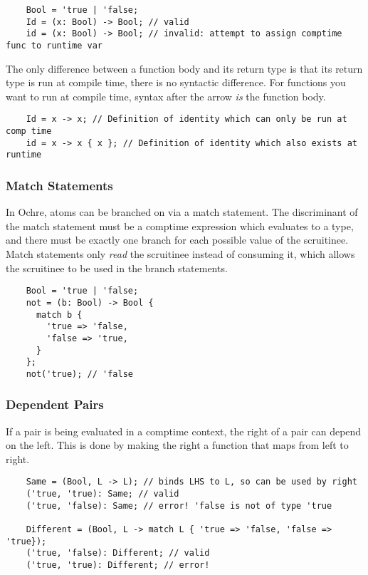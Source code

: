\documentclass[12pt,twoside]{report}
\begin{document}
\begin{listing}[H]
  \begin{verbatim}
    Bool = 'true | 'false;
    Id = (x: Bool) -> Bool; // valid
    id = (x: Bool) -> Bool; // invalid: attempt to assign comptime func to runtime var
  \end{verbatim}
\end{listing}

The only difference between a function body and its return type is that its return type is run at compile time, there is no syntactic difference. For functions you want to run at compile time, syntax after the arrow \textit{is} the function body.

  \begin{verbatim}
    Id = x -> x; // Definition of identity which can only be run at comp time
    id = x -> x { x }; // Definition of identity which also exists at runtime
  \end{verbatim}

\subsubsection{Match Statements}
In Ochre, atoms can be branched on via a match statement. The discriminant of the match statement must be a comptime expression which evaluates to a type, and there must be exactly one branch for each possible value of the scruitinee. Match statements only \textit{read} the scruitinee instead of consuming it, which allows the scruitinee to be used in the branch statements.

  \begin{verbatim}
    Bool = 'true | 'false;
    not = (b: Bool) -> Bool {
      match b {
        'true => 'false,
        'false => 'true,
      }
    };
    not('true); // 'false
  \end{verbatim}

\subsubsection{Dependent Pairs}
If a pair is being evaluated in a comptime context, the right of a pair can depend on the left. This is done by making the right a function that maps from left to right.

  \begin{verbatim}
    Same = (Bool, L -> L); // binds LHS to L, so can be used by right
    ('true, 'true): Same; // valid
    ('true, 'false): Same; // error! 'false is not of type 'true

    Different = (Bool, L -> match L { 'true => 'false, 'false => 'true});
    ('true, 'false): Different; // valid
    ('true, 'true): Different; // error!
  \end{verbatim}
\end{document}
